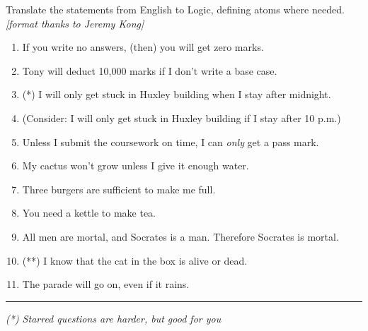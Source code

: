 \documentclass[10pt,a4paper]{article}
\makeatletter
\def\footnoterule{\kern-3\p@
  \hrule \@width 2in \kern 2.6\p@} %
\makeatother
\begin{document}

Translate the statements from English to Logic, defining atoms where needed. \emph{[format thanks to Jeremy Kong]}

\begin{enumerate}
    \item If you write no answers, (then) you will get zero marks.
    \item Tony will deduct 10,000 marks if I don't write a base case.
    \item (*) I will only get stuck in Huxley building when I stay after midnight.
    \item (Consider: I will only get stuck in Huxley building if I stay after 10 p.m.)
    \item Unless I submit the coursework on time, I can \emph{only} get a pass mark.
    \item My cactus won't grow unless I give it enough water.
    \item Three burgers are sufficient to make me full.
    \item You need a kettle to make tea.
    \item All men are mortal, and Socrates is a man. Therefore Socrates is mortal.
    \item (**) I know that the cat in the box is alive or dead.
    \item The parade will go on, even if it rains.
\end{enumerate}

\footnoterule
\emph{(*) Starred questions are harder, but good for you}


\newpage
\end{document}
